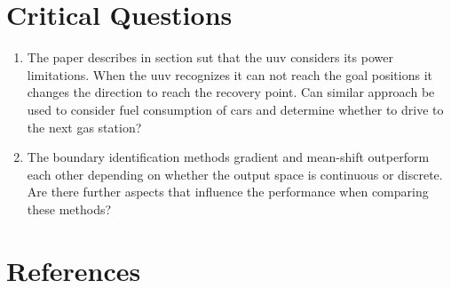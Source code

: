 \documentclass[oneside, notitlepage, twocolumn]{scrartcl}
\begin{document}
\section{Critical Questions}
\begin{enumerate}
    \item The paper describes in section \gls{sut} that the \gls{uuv} considers its power limitations.
        When the \gls{uuv} recognizes it can not reach the goal positions it changes the direction to reach the recovery point.
        Can similar approach be used to consider fuel consumption of cars and determine whether to drive to the next gas station?
    \item The boundary identification methods gradient and mean-shift outperform each other depending on whether the output space is continuous or discrete.
        Are there further aspects that influence the performance when comparing these methods?
\end{enumerate}

\section{References}
\begingroup
\renewcommand{\section}[2]{}%
\nocite{*}
\printbibliography%
\endgroup
\end{document}
